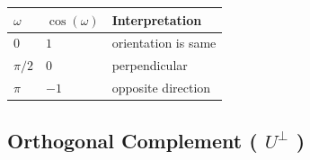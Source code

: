 \begin{customArrayStretch}{1.3}
\begin{table}[H]
    \centering
    \begin{tabular}{|l|l|l|}
        \hline
        $\omega$ & $\cos(\omega)$ & Interpretation \\
        \hline
        $0$ & $1$ & orientation is same \\
        ${\pi}/{2}$ & $0$ & perpendicular \\
        $\pi$ & $-1$ & opposite direction \\
        \hline
    \end{tabular}
\end{table}
\end{customArrayStretch}







\subsection{Orthogonal Complement ( $U^\perp$ )}

